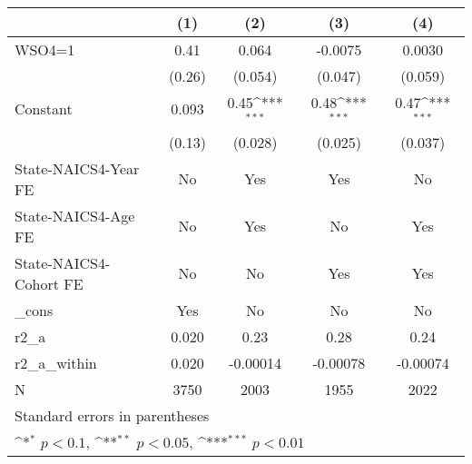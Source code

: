 {
\def\sym#1{\ifmmode^{#1}\else\(^{#1}\)\fi}
\begin{tabular}{l*{4}{c}}
\hline\hline
                    &\multicolumn{1}{c}{(1)}         &\multicolumn{1}{c}{(2)}         &\multicolumn{1}{c}{(3)}         &\multicolumn{1}{c}{(4)}         \\
\hline
WSO4=1              &        0.41         &       0.064         &     -0.0075         &      0.0030         \\
                    &      (0.26)         &     (0.054)         &     (0.047)         &     (0.059)         \\
[1em]
Constant            &       0.093         &        0.45\sym{***}&        0.48\sym{***}&        0.47\sym{***}\\
                    &      (0.13)         &     (0.028)         &     (0.025)         &     (0.037)         \\
[1em]
State-NAICS4-Year FE&          No         &         Yes         &         Yes         &          No         \\
[1em]
State-NAICS4-Age FE &          No         &         Yes         &          No         &         Yes         \\
[1em]
State-NAICS4-Cohort FE&          No         &          No         &         Yes         &         Yes         \\
[1em]
\_cons              &         Yes         &          No         &          No         &          No         \\
\hline
r2\_a                &       0.020         &        0.23         &        0.28         &        0.24         \\
r2\_a\_within         &       0.020         &    -0.00014         &    -0.00078         &    -0.00074         \\
N                   &        3750         &        2003         &        1955         &        2022         \\
\hline\hline
\multicolumn{5}{l}{\footnotesize Standard errors in parentheses}\\
\multicolumn{5}{l}{\footnotesize \sym{*} \(p<0.1\), \sym{**} \(p<0.05\), \sym{***} \(p<0.01\)}\\
\end{tabular}
}
